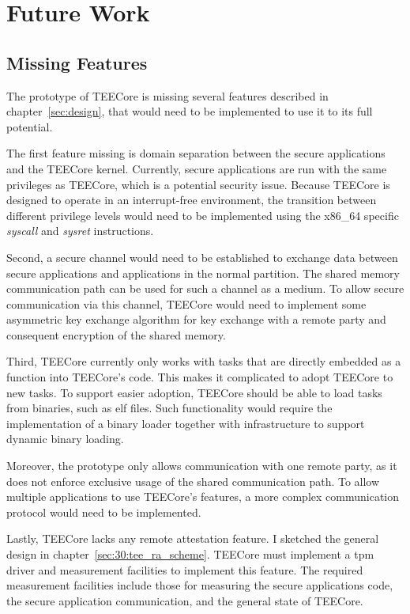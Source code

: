 \chapter{Future Work}
\label{sec:futurework}

\section{Missing Features}
The prototype of TEECore is missing several features described in
chapter~\ref{sec:design}, that would need to be implemented to use it to its
full potential.

The first feature missing is domain separation between the secure applications
and the TEECore kernel. Currently, secure applications are run with the same
privileges as TEECore, which is a potential security issue. Because TEECore is
designed to operate in an interrupt-free environment, the transition between
different privilege levels would need to be implemented using the x86\_64
specific \textit{syscall} and \textit{sysret} instructions.

Second, a secure channel would need to be established to exchange data between
secure applications and applications in the normal partition. The shared memory
communication path can be used for such a channel as a medium. To allow secure
communication via this channel, TEECore would need to implement some asymmetric
key exchange algorithm for key exchange with a remote party and consequent
encryption of the shared memory.

Third, TEECore currently only works with tasks that are directly embedded as a
function into TEECore's code. This makes it complicated to adopt TEECore to new
tasks. To support easier adoption, TEECore should be able to load tasks from
binaries, such as \gls{elf} files. Such functionality would require the
implementation of a binary loader together with infrastructure to support
dynamic binary loading.

Moreover, the prototype only allows communication with one remote party, as it
does not enforce exclusive usage of the shared communication path. To allow
multiple applications to use TEECore's features, a more complex communication
protocol would need to be implemented.

Lastly, TEECore lacks any remote attestation feature. I sketched the general
design in chapter~\ref{sec:30:tee_ra_scheme}. TEECore must implement a \gls{tpm}
driver and measurement facilities to implement this feature. The required
measurement facilities include those for measuring the secure applications code,
the secure application communication, and the general state of TEECore.

